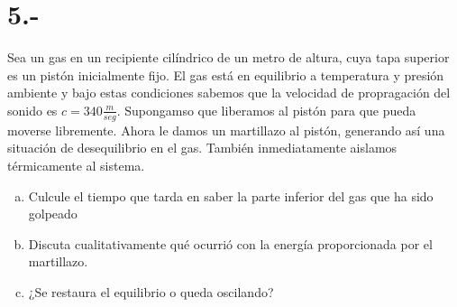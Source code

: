 \documentclass{article}
\begin{document}
\begin{tcolorbox}[breakable]
    
\end{tcolorbox}
\section*{5.-}
Sea un gas en un recipiente cilíndrico de un metro de altura, cuya tapa superior es 
un pistón inicialmente fijo. El gas está en equilibrio a temperatura y presión ambiente
y bajo estas condiciones sabemos que la velocidad de propragación del sonido es 
$c = 340 \frac{m}{seg}$. Supongamso que liberamos al pistón para que pueda moverse 
libremente. Ahora le damos un martillazo al pistón, generando así una situación de
desequilibrio en el gas. También inmediatamente aislamos térmicamente al sistema. 
\begin{enumerate}[a)]
    \item Culcule el tiempo que tarda en saber la parte inferior del gas que ha sido 
    golpeado 

    \item Discuta cualitativamente qué ocurrió con la energía proporcionada por el 
    martillazo. 

    \item ¿Se restaura el equilibrio o queda oscilando?
\end{enumerate}
\end{document}

